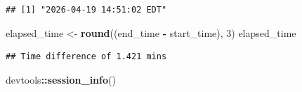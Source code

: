 \documentclass[
]{article}
\newenvironment{Shaded}{\begin{snugshade}}{\end{snugshade}}
\newcommand{\DecValTok}[1]{\textcolor[rgb]{0.00,0.00,0.81}{#1}}
\newcommand{\FunctionTok}[1]{\textcolor[rgb]{0.13,0.29,0.53}{\textbf{#1}}}
\newcommand{\NormalTok}[1]{#1}
\newcommand{\OtherTok}[1]{\textcolor[rgb]{0.56,0.35,0.01}{#1}}
\newcommand{\SpecialCharTok}[1]{\textcolor[rgb]{0.81,0.36,0.00}{\textbf{#1}}}
\begin{document}
\begin{verbatim}
## [1] "2026-04-19 14:51:02 EDT"
\end{verbatim}

\begin{Shaded}
\begin{Highlighting}[]
\NormalTok{elapsed\_time }\OtherTok{\textless{}{-}} \FunctionTok{round}\NormalTok{((end\_time }\SpecialCharTok{{-}}\NormalTok{ start\_time), }\DecValTok{3}\NormalTok{)}
\NormalTok{elapsed\_time}
\end{Highlighting}
\end{Shaded}

\begin{verbatim}
## Time difference of 1.421 mins
\end{verbatim}

\begin{Shaded}
\begin{Highlighting}[]
\NormalTok{devtools}\SpecialCharTok{::}\FunctionTok{session\_info}\NormalTok{()}
\end{Highlighting}
\end{Shaded}
\end{document}
